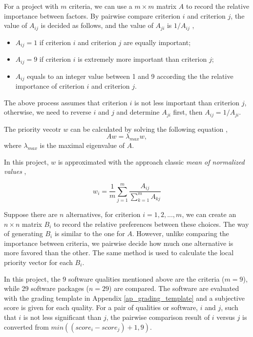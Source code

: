 For a project with $ m $ criteria, we can use a  $m\times m$ matrix $A$ to record the relative importance between factors. By pairwise compare criterion $i$ and criterion $j$, the value of $A_{ij}$ is decided as follows, and the value of $A_{ji}$ is $1/A_{ij}$ \cite{Saaty1990},
\begin{itemize}
\item $A_{ij} = 1$ if criterion $i$ and criterion $j$ are equally important;
\item $A_{ij} = 9$ if criterion $i$ is extremely more important than criterion $j$;
\item $A_{ij}$ equals to an integer value between 1 and 9 according the the relative importance of criterion $i$ and criterion $j$.
\end{itemize}

The above process assumes that criterion $i$ is not less important than criterion $j$, otherwise, we need to reverse $i$ and $j$ and determine $A_{ji}$ first, then $A_{ij} = 1/A_{ji}$.

The priority vecotr $w$ can be calculated by solving the following equation \cite{Saaty1990}, \begin{equation}
Aw = \lambda_{max}w,
\end{equation}
where $\lambda_{max}$ is the maximal eigenvalue of $A$.

In this project, $w$ is approximated with the approach classic \textit{mean of normalized values}  \cite{AlessioEtAl2006},

\begin{equation}
w_i = \frac{1}{m}\sum_{j=1}^{m}\frac{A_{ij}}{\sum_{k=1}^{m}A_{kj}}
\end{equation}

Suppose there are $n$ alternatives, for criterion $i = 1, 2, ... , m$, we can create an $n\times n$ matrix $B_i$ to record the relative preferences between these choices. The way of generating $B_i$ is similar to the one for $A$. However, unlike comparing the importance between criteria, we pairwise decide how much one alternative is more favored than the other. The same method is used to calculate the local priority vector for each $B_i$.

In this project, the 9 software qualities mentioned above are the criteria ($m = 9$), while 29 software packages ($n = 29$) are compared. The software are evaluated with the grading template in Appendix \ref{ap_grading_template} and a subjective score is given for each quality. For a pair of qualities or software, $i$ and $j$, such that $i$ is not less significant than $j$, the pairwise comparison result of $i$ versus $j$ is converted from $min((score_i - score_j) + 1, 9)$.
